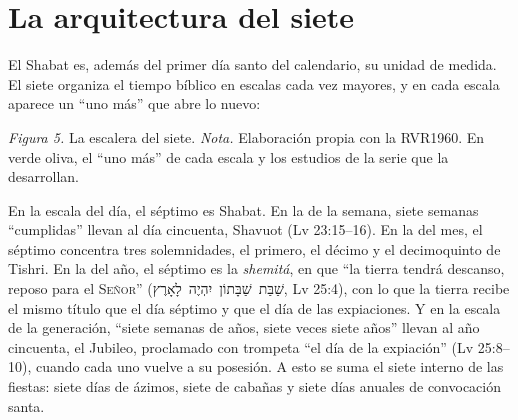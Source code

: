 \documentclass[11pt,letterpaper]{article}
\newcommand{\heb}[1]{\mbox{\foreignlanguage{hebrew}{#1}}}
\newcommand{\SENOR}{\textsc{Señor}}
\begin{document}
\section{La arquitectura del siete}\label{sec:siete}

El Shabat es, además del primer día santo del calendario, su unidad de medida. El siete organiza el tiempo bíblico en escalas cada vez mayores, y en cada escala aparece un ``uno más'' que abre lo nuevo:

\begin{center}
\par
{\footnotesize\color{sepia}\textit{Figura 5.} La escalera del siete. \textit{Nota.} Elaboración propia con la RVR1960. En verde oliva, el ``uno más'' de cada escala y los estudios de la serie que la desarrollan.}
\end{center}

En la escala del día, el séptimo es Shabat. En la de la semana, siete semanas ``cumplidas'' llevan al día cincuenta, Shavuot (Lv 23:15--16). En la del mes, el séptimo concentra tres solemnidades, el primero, el décimo y el decimoquinto de Tishri. En la del año, el séptimo es la \emph{shemitá}, en que ``la tierra tendrá descanso, reposo para el \SENOR'' (\heb{שַׁבַּת שַׁבָּתוֹן יִהְיֶה לָאָרֶץ}, Lv 25:4), con lo que la tierra recibe el mismo título que el día séptimo y que el día de las expiaciones. Y en la escala de la generación, ``siete semanas de años, siete veces siete años'' llevan al año cincuenta, el Jubileo, proclamado con trompeta ``el día de la expiación'' (Lv 25:8--10), cuando cada uno vuelve a su posesión. A esto se suma el siete interno de las fiestas: siete días de ázimos, siete de cabañas y siete días anuales de convocación santa.
\end{document}
